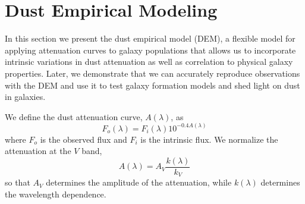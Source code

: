 \section{Dust Empirical Modeling} \label{sec:dem}
In this section we present the dust empirical model (DEM), a flexible model for
applying attenuation curves to galaxy populations that allows us to incorporate
intrinsic variations in dust attenuation as well as correlation to physical
galaxy properties. Later, we demonstrate that we can accurately reproduce
observations with the DEM and use it to test galaxy formation models and shed
light on dust in galaxies. 

We define the dust attenuation curve, $A(\lambda)$, as 
\begin{equation} 
    F_o (\lambda) = F_i (\lambda) 10^{-0.4 A(\lambda)}
\end{equation}
where $F_o$ is the observed flux and $F_i$ is the intrinsic flux. We normalize
the attenuation at the $V$ band, 
\begin{equation} 
    A(\lambda) = A_V \frac{k(\lambda)}{k_V}
\end{equation}
so that $A_V$ determines the amplitude of the attenuation, while $k(\lambda)$
determines the wavelength dependence. 

